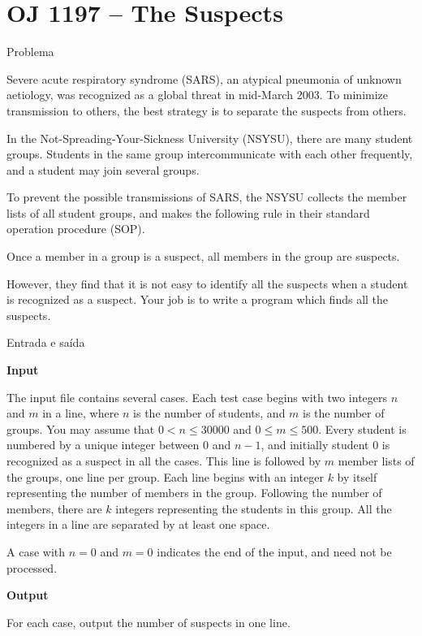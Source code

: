 \section{OJ 1197 -- The Suspects}

\begin{frame}[fragile]{Problema}

Severe acute respiratory syndrome (SARS), an atypical pneumonia of unknown aetiology, was recognized as a global threat in mid-March 2003. To minimize transmission to others, the best strategy is
to separate the suspects from others.

In the Not-Spreading-Your-Sickness University (NSYSU), there are many student groups. Students
in the same group intercommunicate with each other frequently, and a student may join several groups.

To prevent the possible transmissions of SARS, the NSYSU collects the member lists of all student
groups, and makes the following rule in their standard operation procedure (SOP).

\begin{center}
Once a member in a group is a suspect, all members in the group are suspects.
\end{center}

However, they find that it is not easy to identify all the suspects when a student is recognized as a
suspect. Your job is to write a program which finds all the suspects.

\end{frame}

\begin{frame}[fragile]{Entrada e saída}

\textbf{Input}

The input file contains several cases. Each test case begins with two integers $n$ and $m$ in a 
line, where $n$ is the number of students, and $m$ is the number of groups. You may assume that 
$0 < n \leq 30000$ and $0 \leq m \leq 500$. Every student is numbered by a unique integer between 
$0$ and $n - 1$, and initially student $0$ is recognized as a suspect in all the cases. This line 
is followed by $m$ member lists of the groups, one line per group. Each line begins with an 
integer $k$ by itself representing the number of members in the group. Following the number of 
members, there are $k$ integers representing the students in this group.  All the integers in a 
line are separated by at least one space.

A case with $n = 0$ and $m = 0$ indicates the end of the input, and need not be processed.

\textbf{Output}

For each case, output the number of suspects in one line.

\end{frame}


